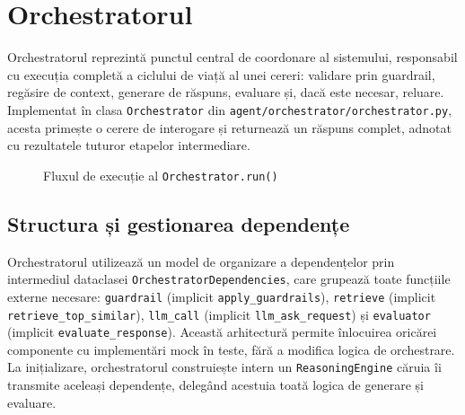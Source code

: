 \documentclass[12pt, a4paper, oneside, romanian]{teza-upb}
\begin{document}
\section{Orchestratorul}

Orchestratorul reprezintă punctul central de coordonare al sistemului, responsabil cu execuția completă a ciclului de viață al unei cereri: validare prin guardrail, regăsire de context, generare de răspuns, evaluare și, dacă este necesar, reluare. Implementat în clasa \texttt{Orchestrator} din \texttt{agent/orchestrator/orchestrator.py}, acesta primește o cerere de interogare și returnează un răspuns complet, adnotat cu rezultatele tuturor etapelor intermediare.

\begin{figure}[H]
\centering
{}
\caption{Fluxul de execuție al \texttt{Orchestrator.run()}}
\label{fig:orchestrator}
\end{figure}

\subsection{Structura și gestionarea dependențe}

Orchestratorul utilizează un model de organizare a dependențelor prin intermediul 
dataclasei \texttt{OrchestratorDependencies}, care grupează toate funcțiile externe necesare: \texttt{guardrail} (implicit \texttt{apply\_guardrails}), \texttt{retrieve} (implicit \texttt{retrieve\_top\_similar}), \texttt{llm\_call} (implicit \texttt{llm\_ask\_request}) și \texttt{evaluator} (implicit \texttt{evaluate\_response}). Această arhitectură permite înlocuirea oricărei componente cu implementări mock în teste, fără a modifica logica de orchestrare. La inițializare, orchestratorul construiește intern un \texttt{ReasoningEngine} căruia îi transmite aceleași dependențe, delegând acestuia toată logica de generare și evaluare.
\end{document}
